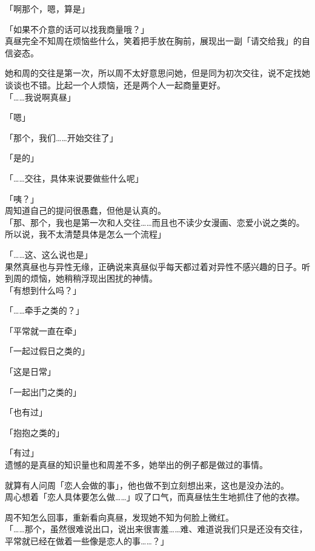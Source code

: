「啊那个，嗯，算是」

「如果不介意的话可以找我商量哦？」\\

真昼完全不知周在烦恼些什么，笑着把手放在胸前，展现出一副「请交给我」的自信姿态。

她和周的交往是第一次，所以周不太好意思问她，但是同为初次交往，说不定找她谈谈也不错。比起一个人烦恼，还是两个人一起商量更好。\\

「……我说啊真昼」

「嗯」

「那个，我们……开始交往了」

「是的」

「……交往，具体来说要做些什么呢」

「咦？」\\

周知道自己的提问很愚蠢，但他是认真的。\\

「那、那个，我也是第一次和人交往……而且也不读少女漫画、恋爱小说之类的。所以说，我不太清楚具体是怎么一个流程」

「……这、这么说也是」\\

果然真昼也与异性无缘，正确说来真昼似乎每天都过着对异性不感兴趣的日子。听到周的烦恼，她稍稍浮现出困扰的神情。\\

「有想到什么吗？」

「……牵手之类的？」

「平常就一直在牵」

「一起过假日之类的」

「这是日常」

「一起出门之类的」

「也有过」

「抱抱之类的」

「有过」\\

遗憾的是真昼的知识量也和周差不多，她举出的例子都是做过的事情。

就算有人问周「恋人会做的事」，他也做不到立刻想出来，这也是没办法的。\\

周心想着「恋人具体要怎么做……」叹了口气，而真昼怯生生地抓住了他的衣襟。

周不知怎么回事，重新看向真昼，发现她不知为何脸上微红。\\

「……那个，虽然很难说出口，说出来很害羞……难、难道说我们只是还没有交往，平常就已经在做着一些像是恋人的事……？」\\

